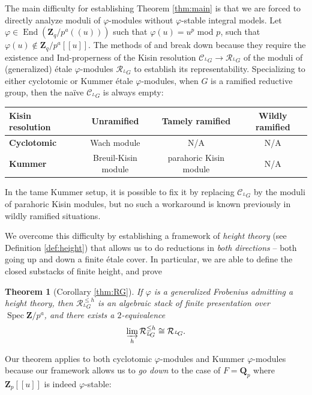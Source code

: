 \documentclass[11pt]{amsart}
\newtheorem{thm}{Theorem}
\numberwithin{thm}{section}
\numberwithin{lem}{section}
\numberwithin{cor}{section}
\numberwithin{prop}{section}
\numberwithin{exam}{section}
\numberwithin{dfn}{section}
\newcommand{\End}{\operatorname{End}}
\newcommand{\spec}{\operatorname{Spec}}
\newcommand{\cC}{\mathcal{C}}
\newcommand{\calR}{\mathcal{R}}
\newcommand{\clR}{\mathcal{R}}
\newcommand{\Z}{\mathbf{Z}}
\newcommand{\Q}{\mathbf{Q}}
\newcommand{\Qp}{\Q_p}
\newcommand{\lsup}[2]{{^{#1}\!#2}}
\begin{document}
The main difficulty for establishing Theorem \ref{thm:main}
is that we are forced to directly analyze
moduli of $\varphi$-modules
without $\varphi$-stable integral models.
Let $\varphi\in \End(\Z_q/p^a(\!(u)\!))$
such that $\varphi(u)=u^p$ mod $p$,
such that $\varphi(u)\not\in \Z_q/p^a[\![u]\!]$.
The methods of \cite{PR09} and \cite{EG23}
break down
because they require the existence
and Ind-properness
of the Kisin resolution $\cC_{\lsup LG}\to\clR_{\lsup LG}$
of the moduli of
(generalized) \'etale $\varphi$-modules
$\clR_{\lsup LG}$
to establish its representability.
Specializing to either cyclotomic or Kummer \'etale $\varphi$-modules,
when $G$ is a ramified reductive group,
then the na\"ive $\cC_{\lsup LG}$ is always empty:

\begin{center}
\begin{tabular}{lccc}
\toprule
\textbf{Kisin resolution} & \textbf{Unramified} & \textbf{Tamely ramified} & \textbf{Wildly ramified} \\
\midrule
{\textbf{Cyclotomic}}
  & Wach module           & N/A                   & N/A \\
\midrule
{\textbf{Kummer}}
    & Breuil-Kisin module   & parahoric Kisin module & N/A \\
\bottomrule
\end{tabular}
\end{center}
In the tame Kummer setup,
it is possible to fix it by replacing $\cC_{\lsup LG}$
by the moduli of parahoric Kisin modules,
but no such a workaround is known previously
in wildly ramified situations.

We overcome this difficulty
by establishing a framework
of {\it height theory}
(see Definition \ref{def:height})
that allows us to do reductions
in {\it both directions}
--
both
going up and
down {a finite \'etale cover}.
In particular,
we are able to define the closed substacks
of finite height,
and prove

\begin{thm}
[Corollary \ref{thm:RG}]
If $\varphi$
is a generalized Frobenius admitting a height theory,
then
$\calR_{\lsup LG}^{\le h}$ is an algebraic stack
of finite presentation over $\spec \Z/p^a$,
and there exists a $2$-equivalence
\[
\varinjlim_h \clR_{\lsup LG}^{\le h}
\cong \clR_{\lsup LG}.
\]
\end{thm}

Our theorem applies to both cyclotomic $\varphi$-modules
and Kummer $\varphi$-modules
because our framework allows us to {\it go down}
to the case of $F=\Qp$
where $\Z_p[\![u]\!]$ is indeed $\varphi$-stable:
\end{document}
